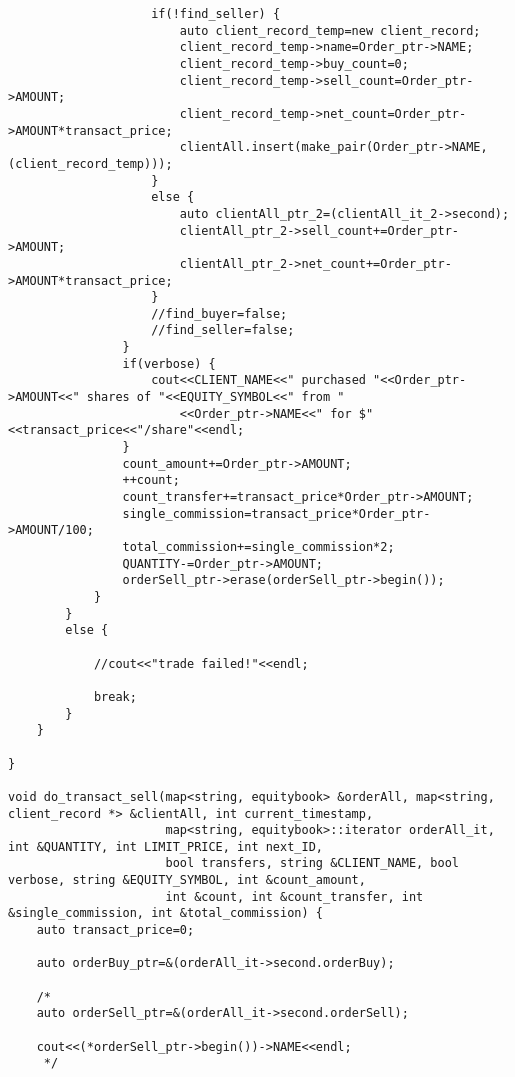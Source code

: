\documentclass{article}
\begin{document}
\begin{spacing}{1.5}
\begin{lstlisting}
                    if(!find_seller) {
                        auto client_record_temp=new client_record;
                        client_record_temp->name=Order_ptr->NAME;
                        client_record_temp->buy_count=0;
                        client_record_temp->sell_count=Order_ptr->AMOUNT;
                        client_record_temp->net_count=Order_ptr->AMOUNT*transact_price;
                        clientAll.insert(make_pair(Order_ptr->NAME, (client_record_temp)));
                    }
                    else {
                        auto clientAll_ptr_2=(clientAll_it_2->second);
                        clientAll_ptr_2->sell_count+=Order_ptr->AMOUNT;
                        clientAll_ptr_2->net_count+=Order_ptr->AMOUNT*transact_price;
                    }
                    //find_buyer=false;
                    //find_seller=false;
                }
                if(verbose) {
                    cout<<CLIENT_NAME<<" purchased "<<Order_ptr->AMOUNT<<" shares of "<<EQUITY_SYMBOL<<" from "
                        <<Order_ptr->NAME<<" for $"<<transact_price<<"/share"<<endl;
                }
                count_amount+=Order_ptr->AMOUNT;
                ++count;
                count_transfer+=transact_price*Order_ptr->AMOUNT;
                single_commission=transact_price*Order_ptr->AMOUNT/100;
                total_commission+=single_commission*2;
                QUANTITY-=Order_ptr->AMOUNT;
                orderSell_ptr->erase(orderSell_ptr->begin());
            }
        }
        else {

            //cout<<"trade failed!"<<endl;

            break;
        }
    }

}

void do_transact_sell(map<string, equitybook> &orderAll, map<string, client_record *> &clientAll, int current_timestamp,
                      map<string, equitybook>::iterator orderAll_it, int &QUANTITY, int LIMIT_PRICE, int next_ID,
                      bool transfers, string &CLIENT_NAME, bool verbose, string &EQUITY_SYMBOL, int &count_amount,
                      int &count, int &count_transfer, int &single_commission, int &total_commission) {
    auto transact_price=0;

    auto orderBuy_ptr=&(orderAll_it->second.orderBuy);

    /*
    auto orderSell_ptr=&(orderAll_it->second.orderSell);

    cout<<(*orderSell_ptr->begin())->NAME<<endl;
     */



\end{lstlisting}
\end{spacing}
\end{document}
